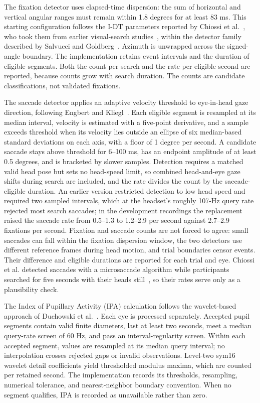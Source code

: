 The fixation detector uses elapsed-time dispersion: the sum of horizontal and vertical angular ranges must remain within 1.8 degrees for at least 83 ms. This starting configuration follows the I-DT parameters reported by Chiossi et al.~\cite{chiossi2024searching}, who took them from earlier visual-search studies~\cite{beintema2005saccadic,vandenberg2005invariant}, within the detector family described by Salvucci and Goldberg~\cite{salvucci2000fixations}. Azimuth is unwrapped across the signed-angle boundary. The implementation retains event intervals and the duration of eligible segments. Both the count per search and the rate per eligible second are reported, because counts grow with search duration. The counts are candidate classifications, not validated fixations.

The saccade detector applies an adaptive velocity threshold to eye-in-head gaze direction, following Engbert and Kliegl~\cite{engbert2003microsaccades}. Each eligible segment is resampled at its median interval, velocity is estimated with a five-point derivative, and a sample exceeds threshold when its velocity lies outside an ellipse of six median-based standard deviations on each axis, with a floor of 1 degree per second. A candidate saccade stays above threshold for 6--100 ms, has an endpoint amplitude of at least 0.5 degrees, and is bracketed by slower samples. Detection requires a matched valid head pose but sets no head-speed limit, so combined head-and-eye gaze shifts during search are included, and the rate divides the count by the saccade-eligible duration. An earlier version restricted detection to low head speed and required two sampled intervals, which at the headset's roughly 107-Hz query rate rejected most search saccades; in the development recordings the replacement raised the saccade rate from 0.5--1.3 to 1.2--2.9 per second against 2.7--2.9 fixations per second. Fixation and saccade counts are not forced to agree: small saccades can fall within the fixation dispersion window, the two detectors use different reference frames during head motion, and trial boundaries censor events. Their difference and eligible durations are reported for each trial and eye. Chiossi et al. detected saccades with a microsaccade algorithm while participants searched for five seconds with their heads still~\cite{chiossi2024searching}, so their rates serve only as a plausibility check.

The Index of Pupillary Activity (IPA) calculation follows the wavelet-based approach of Duchowski et al.~\cite{duchowski2018ipa}. Each eye is processed separately. Accepted pupil segments contain valid finite diameters, last at least two seconds, meet a median query-rate screen of 60 Hz, and pass an interval-regularity screen. Within each accepted segment, values are resampled at its median query interval; no interpolation crosses rejected gaps or invalid observations. Level-two sym16 wavelet detail coefficients yield thresholded modulus maxima, which are counted per retained second. The implementation records its thresholds, resampling, numerical tolerance, and nearest-neighbor boundary convention. When no segment qualifies, IPA is recorded as unavailable rather than zero.

